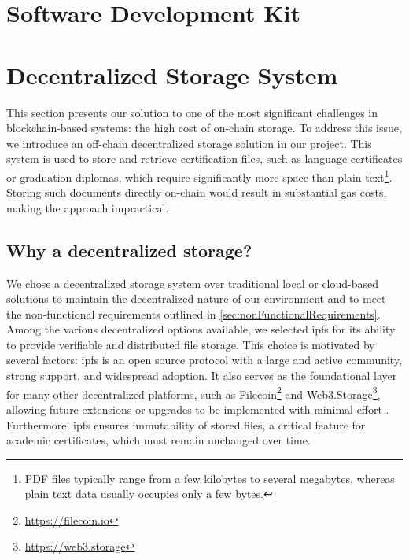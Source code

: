 \section{Software Development Kit}
\label{sec:sdkDesign}

\section{Decentralized Storage System}
\label{sec:decStorageDesgn}
This section presents our solution to one of the most significant challenges in blockchain-based systems: the high cost of on-chain storage. To address this issue, we introduce an off-chain decentralized storage solution in our project. This system is used to store and retrieve certification files, such as language certificates or graduation diplomas, which require significantly more space than plain text\footnote{PDF files typically range from a few kilobytes to several megabytes, whereas plain text data usually occupies only a few bytes.}. Storing such documents directly on-chain would result in substantial gas costs, making the approach impractical. 

\subsection{Why a decentralized storage?}
We chose a decentralized storage system over traditional local or cloud-based solutions to maintain the decentralized nature of our environment and to meet the non-functional requirements outlined in \cref{sec:nonFunctionalRequirements}. Among the various decentralized options available, we selected \acrfull{ipfs} for its ability to provide verifiable and distributed file storage. This choice is motivated by several factors: \acrshort{ipfs} is an open source protocol with a large and active community, strong support, and widespread adoption. It also serves as the foundational layer for many other decentralized platforms, such as Filecoin\footnote{\url{https://filecoin.io}} and Web3.Storage\footnote{\url{https://web3.storage}}, allowing future extensions or upgrades to be implemented with minimal effort \cite{erikflorian2022ipfsandfrineds}. Furthermore, \acrshort{ipfs} ensures immutability of stored files, a critical feature for academic certificates, which must remain unchanged over time.

